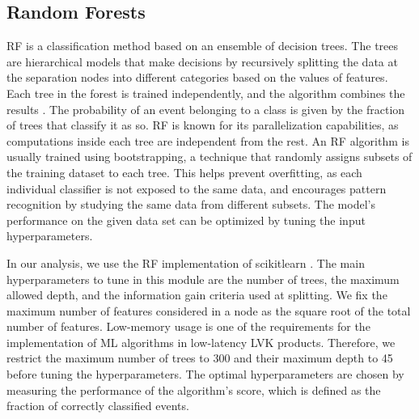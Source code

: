 \subsection*{Random Forests}

\ac{RF} is a classification method based on an ensemble of decision trees. The trees are hierarchical models that make decisions by recursively splitting the data at the separation nodes into different categories based on the values of features. Each tree in the forest is trained independently, and the algorithm combines the results . The probability of an event belonging to a class is given by the fraction of trees that classify it as so. \ac{RF} is known for its parallelization capabilities, as computations inside each tree are independent from the rest. An \ac{RF} algorithm is usually trained using bootstrapping, a technique that randomly assigns subsets of the training dataset to each tree. This helps prevent overfitting, as each individual classifier is not exposed to the same data, and encourages pattern recognition by studying the same data from different subsets. The model's performance on the given data set can be optimized by tuning the input hyperparameters.

In our analysis, we use the \ac{RF} implementation of scikitlearn \cite{Pedregosa:2011}. The main hyperparameters to tune in this module are the number of trees, the maximum allowed depth, and the information gain criteria used at splitting. We fix the maximum number of features considered in a node  as the square root of the total number of features. Low-memory usage is one of the requirements for the implementation of \ac{ML} algorithms in low-latency \ac{LVK} products. Therefore, we restrict the maximum number of trees to 300 and their maximum depth to 45 before tuning the hyperparameters. The optimal hyperparameters are chosen by measuring the performance of the algorithm's score, which is defined as the fraction of correctly classified events.  


 



